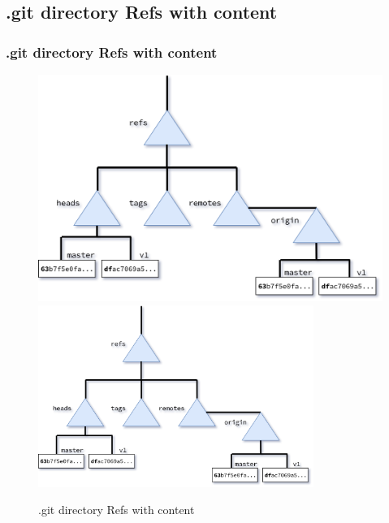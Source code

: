 \subsection*{.git directory Refs with content}
\begin{frame}[fragile]
    \frametitle{.git directory Refs with content}
    \begin{figure}
        \begin{center}
            {
                \includegraphics[height=0.75\textheight,keepaspectratio]{./images/gitDirectory-Refs_Content.png}
            }
            {
                \includegraphics[height=0.75\textheight,width=0.8\textwidth]{./images/gitDirectory-Refs_Content.png}
            }
            \caption{.git directory Refs with content}
        \end{center}
    \end{figure}
\end{frame}

